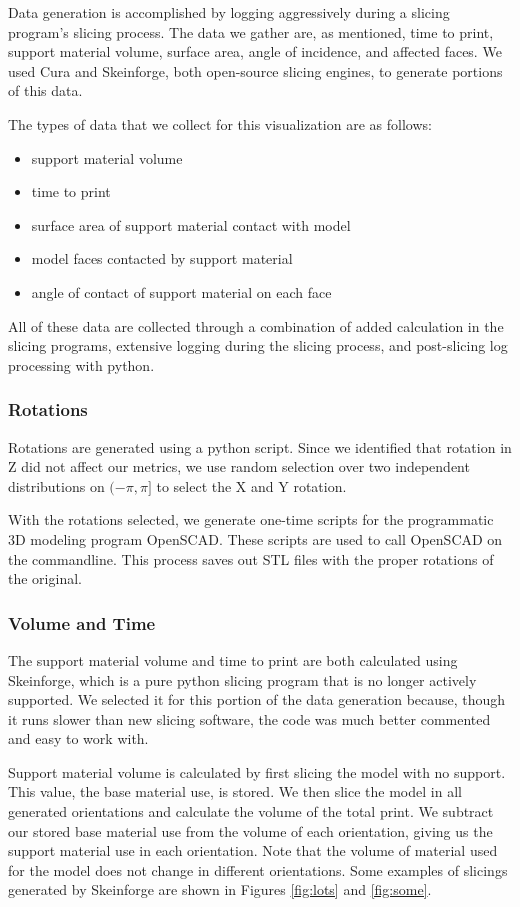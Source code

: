\documentclass{sigchi}
\begin{document}
Data generation is accomplished by logging aggressively during a slicing program's slicing process.  The data we gather are, as mentioned, time to print, support material volume, surface area, angle of incidence, and affected faces.  We used Cura and Skeinforge, both open-source slicing engines, to generate portions of this data.

The types of data that we collect for this visualization are as follows:
\begin{itemize}
\item support material volume
\item time to print
\item surface area of support material contact with model
\item model faces contacted by support material
\item angle of contact of support material on each face
\end{itemize}

All of these data are collected through a combination of added calculation in the slicing programs, extensive logging during the slicing process, and post-slicing log processing with python.

\subsubsection{Rotations}
Rotations are generated using a python script.  Since we identified that rotation in Z did not affect our metrics, we use random selection over two independent distributions on $(-\pi,\pi]$ to select the X and Y rotation.

With the rotations selected, we generate one-time scripts for the programmatic 3D modeling program OpenSCAD.  These scripts are used to call OpenSCAD on the commandline.  This process saves out STL files with the proper rotations of the original.

\subsubsection{Volume and Time}
The support material volume and time to print are both calculated using Skeinforge, which is a pure python slicing program that is no longer actively supported.  We selected it for this portion of the data generation because, though it runs slower than new slicing software, the code was much better commented and easy to work with.

Support material volume is calculated by first slicing the model with no support.  This value, the base material use, is stored.  We then slice the model in all generated orientations and calculate the volume of the total print.  We subtract our stored base material use from the volume of each orientation, giving us the support material use in each orientation.  Note that the volume of material used for the model does not change in different orientations.  Some examples of slicings generated by Skeinforge are shown in Figures \ref{fig:lots} and \ref{fig:some}.
\end{document}
